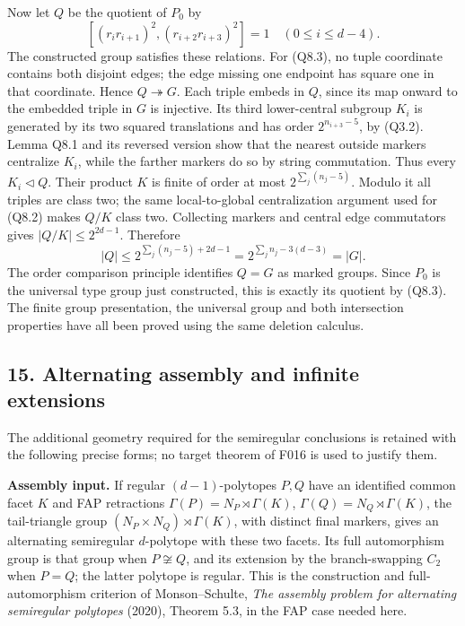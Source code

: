 \documentclass[
  10pt,
  letterpaper,
]{article}
\begin{document}
Now let \(Q\) be the quotient of \(P_0\) by \[
 [(r_i r_{i+1})^2,(r_{i+2}r_{i+3})^2]=1
 \quad(0\le i\le d-4).                                  \tag{Q8.3}
\] The constructed group satisfies these relations. For (Q8.3), no tuple
coordinate contains both disjoint edges; the edge missing one endpoint
has square one in that coordinate. Hence \(Q\twoheadrightarrow G\). Each
triple embeds in \(Q\), since its map onward to the embedded triple in
\(G\) is injective. Its third lower-central subgroup \(K_i\) is
generated by its two squared translations and has order
\(2^{n_{i+3}-5}\), by (Q3.2). Lemma Q8.1 and its reversed version show
that the nearest outside markers centralize \(K_i\), while the farther
markers do so by string commutation. Thus every \(K_i\lhd Q\). Their
product \(K\) is finite of order at most \(2^{\sum_j(n_j-5)}\). Modulo
it all triples are class two; the same local-to-global centralization
argument used for (Q8.2) makes \(Q/K\) class two. Collecting markers and
central edge commutators gives \(|Q/K|\le2^{2d-1}\). Therefore \[
 |Q|\le2^{\sum_j(n_j-5)+2d-1}
      =2^{\sum_j n_j-3(d-3)}=|G|.
\] The order comparison principle identifies \(Q=G\) as marked groups.
Since \(P_0\) is the universal type group just constructed, this is
exactly its quotient by (Q8.3). The finite group presentation, the
universal group and both intersection properties have all been proved
using the same deletion calculus.

\subsection{15. Alternating assembly and infinite
extensions}\label{alternating-assembly-and-infinite-extensions}

The additional geometry required for the semiregular conclusions is
retained with the following precise forms; no target theorem of F016 is
used to justify them.

\textbf{Assembly input.} If regular \((d-1)\)-polytopes \(P,Q\) have an
identified common facet \(K\) and FAP retractions
\(\Gamma(P)=N_P\rtimes\Gamma(K)\), \(\Gamma(Q)=N_Q\rtimes\Gamma(K)\),
the tail-triangle group \((N_P\times N_Q)\rtimes\Gamma(K)\), with
distinct final markers, gives an alternating semiregular \(d\)-polytope
with these two facets. Its full automorphism group is that group when
\(P\not\cong Q\), and its extension by the branch-swapping \(C_2\) when
\(P=Q\); the latter polytope is regular. This is the construction and
full-automorphism criterion of Monson--Schulte, \emph{The assembly
problem for alternating semiregular polytopes} (2020), Theorem 5.3, in
the FAP case needed here.
\end{document}
